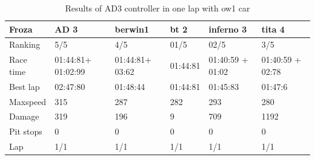 \documentclass{llncs}
\begin{document}
\begin{table}[h!]
	\caption{Results of AD3 controller in one lap with ow1 car}
	\label{resultat35}
	\begin{tabular}{ |p{3cm}|p{2cm}|p{2cm}|p{2 cm}|p{2 cm}|p{2 cm}|}
		\hline
		{ \color{blue}\textbf{Froza} }&
		{ \color{red} \textbf{ AD 3} } &
		{ \color{red}\textbf{ berwin1 }}&  
		{ \color{red} \textbf{bt 2 } } &
		
		{ \color{red} \textbf{inferno 3} }
		&{ \color{red} \textbf{tita 4} }
		\\
		\hline
		Ranking  & 5/5  & 4/5 & 01/5 & 02/5& 3/5
		\\
		\hline
		Race time &  01:44:81+ 01:02:99 & 01:44:81+ 03:62  &  01:44:81   &  01:40:59 + 01:02 &   01:40:59 + 02:78 
		\\
		\hline
		Best lap & 02:47:80 &  01:48:44 & 01:44:81 & 01:45:83& 01:47:6
		\\
		\hline 
		Maxspeed & 315  & 287 & 282 & 293 & 280
		\\
		\hline
		
		Damage & 319 & 196 & 9 & 709 & 1192
		\\
		\hline 
		
		
		Pit stops & 0 & 0 & 0 & 0 & 0
		\\
		\hline 
		Lap & 1/1 & 1/1  & 1/1 & 1/1& 1/1 
		\\
		\hline	
	\end{tabular} 
	
\end{table}
\end{document}

